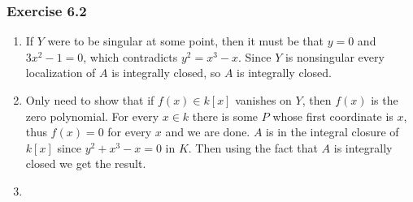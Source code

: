 \documentclass{note}
\newcommand{\Ex}[1]{\subsubsection*{Exercise #1}}
\begin{document}
\Ex{6.2}
\begin{enumerate}
\item If $Y$ were to be singular at some point, then it must be that
  $y = 0$ and $3x^2-1 = 0$, which contradicts $y^2 = x^3 - x$. Since
  $Y$ is nonsingular every localization of $A$ is integrally closed,
  so $A$ is integrally closed.
\item Only need to show that if $f(x) \in k[x]$ vanishes on $Y$, then
  $f(x)$ is the zero polynomial. For every $x\in k$ there is some $P$
  whose first coordinate is $x$, thus $f(x) = 0$ for every $x$ and we
  are done. $A$ is in the integral closure of $k[x]$ since
  $y^2 + x^3 - x = 0$ in $K$. Then using the fact that $A$ is
  integrally closed we get the result.
\item 
\end{enumerate}
\end{document}
